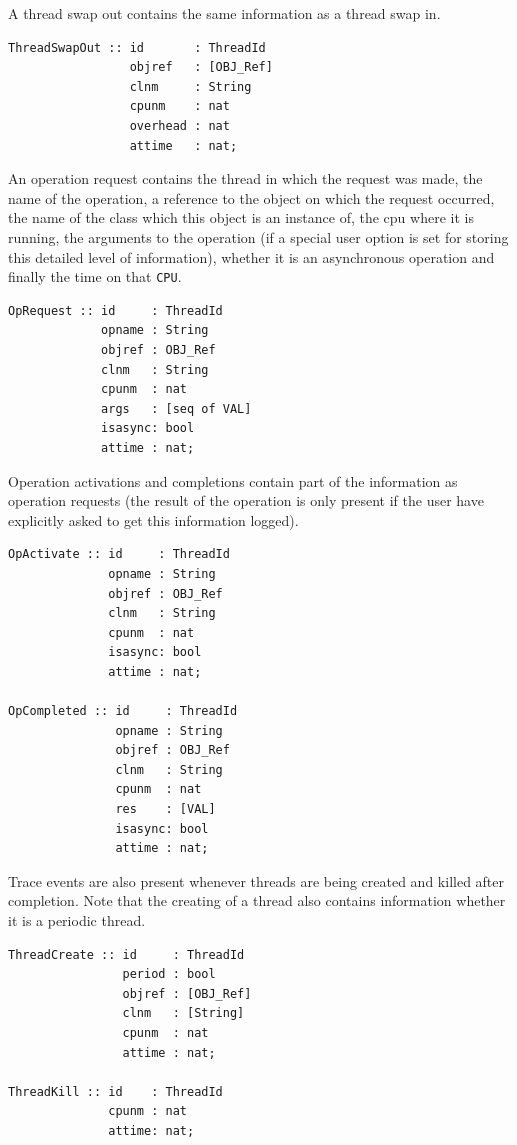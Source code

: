 \documentclass{overturerepchap}
\begin{document}
A thread swap out contains the same information as a thread swap in.

\begin{lstlisting}
ThreadSwapOut :: id       : ThreadId
                 objref   : [OBJ_Ref]
                 clnm     : String
                 cpunm    : nat
                 overhead : nat
                 attime   : nat;
\end{lstlisting}

An operation request contains the thread in which the request was made,
the name of the operation, a reference
to the object on which the request occurred, the name of the class
which this object is an instance of, the cpu where it is running, the 
arguments to the operation (if a special user option is set for storing
this detailed level of information), whether it is an asynchronous operation
and finally the time on that \texttt{CPU}.

\begin{lstlisting}
OpRequest :: id     : ThreadId
             opname : String
             objref : OBJ_Ref
             clnm   : String
             cpunm  : nat
             args   : [seq of VAL]
             isasync: bool
             attime : nat;
\end{lstlisting}

Operation activations and completions contain part of the information as
operation requests (the result of the operation is only present if the 
user have explicitly asked to get this information logged).

\begin{lstlisting}
OpActivate :: id     : ThreadId
              opname : String
              objref : OBJ_Ref
              clnm   : String
              cpunm  : nat
              isasync: bool
              attime : nat;

OpCompleted :: id     : ThreadId
               opname : String
               objref : OBJ_Ref
               clnm   : String
               cpunm  : nat
               res    : [VAL]
               isasync: bool
               attime : nat;
\end{lstlisting}

Trace events are also present whenever threads are being created and killed
after completion. Note that the creating of a thread also contains information
whether it is a periodic thread.

\begin{lstlisting}
ThreadCreate :: id     : ThreadId
                period : bool
                objref : [OBJ_Ref]
                clnm   : [String] 
                cpunm  : nat
                attime : nat;

ThreadKill :: id    : ThreadId
              cpunm : nat
              attime: nat;
\end{lstlisting}
\end{document}
